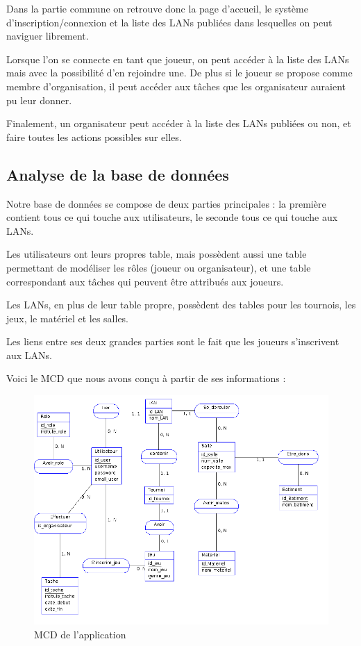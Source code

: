 \documentclass[12pt]{article}
\begin{document}
Dans la partie commune on retrouve donc la page d'accueil, le système d'inscription/connexion et la liste des LANs publiées dans lesquelles on peut naviguer librement. 
\newline

Lorsque l'on se connecte en tant que joueur, on peut accéder à la liste des LANs mais avec la possibilité d'en rejoindre une. De plus si le joueur se propose comme membre d'organisation, il peut accéder aux tâches que les organisateur auraient pu leur donner. 
\newline

Finalement, un organisateur peut accéder à la liste des LANs publiées ou non, et faire toutes les actions possibles sur elles.
\newpage
\subsection{Analyse de la base de données}

Notre base de données se compose de deux parties principales : la première contient tous ce qui touche aux utilisateurs, le seconde tous ce qui touche aux LANs. 
\newline

Les utilisateurs ont leurs propres table, mais possèdent aussi une table permettant de modéliser les rôles (joueur ou organisateur), et une table correspondant aux tâches qui peuvent être attribués aux joueurs. 
\newline

Les LANs, en plus de leur table propre, possèdent des tables pour les tournois, les jeux, le matériel et les salles. 
\newline

Les liens entre ses deux grandes parties sont le fait que les joueurs s'inscrivent aux LANs.
\newline

Voici le MCD que nous avons conçu à partir de ses informations : 

\begin{figure}[htp]
\centering
\includegraphics[scale=0.50]{images/mcd.png}
\caption{MCD de l'application}
\label{}
\end{figure}
\end{document}

